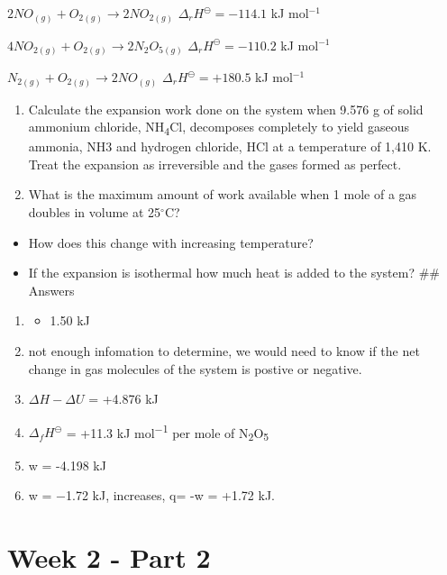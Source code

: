 \documentclass[
]{book}
\providecommand{\tightlist}{%
  \setlength{\itemsep}{0pt}\setlength{\parskip}{0pt}}
\begin{document}
\(2 NO_{(g)} + O_{2(g)} \longrightarrow 2 NO_{2(g)}\) \(\Delta _r H^\ominus = -114.1\) kJ mol\(^{-1}\)

\(4 NO_{2(g)} + O_{2(g)} \longrightarrow 2 N_2 O_{5(g)}\) \(\Delta _r H^\ominus = -110.2\) kJ mol\(^{-1}\)

\(N_{2(g)} + O_{2(g)} \longrightarrow 2 NO_{(g)}\) \(\Delta _r H^\ominus = +180.5\) kJ mol\(^{-1}\)

\begin{enumerate}
\def\labelenumi{\arabic{enumi}.}
\setcounter{enumi}{4}
\item
  Calculate the expansion work done on the system when 9.576 g of solid ammonium chloride, NH\textsubscript{4}Cl, decomposes completely to yield gaseous ammonia, NH3 and hydrogen chloride, HCl at a temperature of 1,410 K. Treat the expansion as irreversible and the gases formed as perfect.
\item
  What is the maximum amount of work available when 1 mole of a gas doubles in volume at 25\(^\circ\)C?
\end{enumerate}

\begin{itemize}
\tightlist
\item
  How does this change with increasing temperature?
\item
  If the expansion is isothermal how much heat is added to the system?
  \#\# Answers
\end{itemize}

\begin{enumerate}
\def\labelenumi{\arabic{enumi}.}
\item
  \begin{itemize}
  \tightlist
  \item
    1.50 kJ
  \end{itemize}
\item
  not enough infomation to determine, we would need to know if the net change in gas molecules of the system is postive or negative.
\item
  \(\Delta H - \Delta U\) = +4.876 kJ
\item
  \(Δ_fH^\ominus\) = +11.3 kJ mol\textsuperscript{−1} per mole of N\textsubscript{2}O\textsubscript{5}
\item
  w = -4.198 kJ
\item
  w = −1.72 kJ, increases, q= -w = +1.72 kJ.
\end{enumerate}

\hypertarget{ch:Part4}{%
\chapter{Week 2 - Part 2}\label{ch:Part4}}
\end{document}
